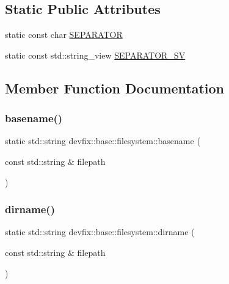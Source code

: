 \subsection*{Static Public Attributes}
\begin{DoxyCompactItemize}
\item 
static const char \hyperlink{structdevfix_1_1base_1_1filesystem_ad081255decbcf3dafe5f155b7193b05b}{S\+E\+P\+A\+R\+A\+T\+OR}
\item 
static const std\+::string\+\_\+view \hyperlink{structdevfix_1_1base_1_1filesystem_abc6bdc561a5baa7b4b8da2c3cdb915b9}{S\+E\+P\+A\+R\+A\+T\+O\+R\+\_\+\+SV}
\end{DoxyCompactItemize}


\subsection{Member Function Documentation}
\mbox{\label{structdevfix_1_1base_1_1filesystem_a93c1a012676ba19073545d6fd59d6ac3}} 
\subsubsection{\texorpdfstring{basename()}{basename()}}
{\footnotesize\ttfamily static std\+::string devfix\+::base\+::filesystem\+::basename (\begin{DoxyParamCaption}\item[{const std\+::string \&}]{filepath }\end{DoxyParamCaption})\hspace{0.3cm}{\ttfamily [static]}}

\mbox{\label{structdevfix_1_1base_1_1filesystem_a4eda25bbce0188a5b2e9899a054e0854}} 
\subsubsection{\texorpdfstring{dirname()}{dirname()}}
{\footnotesize\ttfamily static std\+::string devfix\+::base\+::filesystem\+::dirname (\begin{DoxyParamCaption}\item[{const std\+::string \&}]{filepath }\end{DoxyParamCaption})\hspace{0.3cm}{\ttfamily [static]}}

